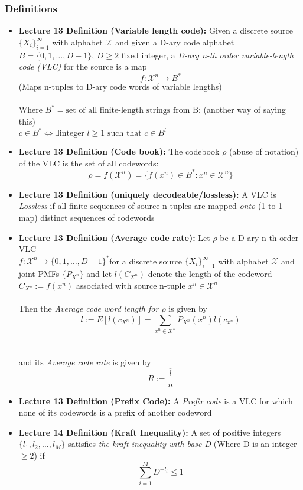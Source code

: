 \documentclass{article}
\begin{document}
\subsubsection{Definitions}
\begin{itemize}
    \item \textbf{Lecture 13 Definition (Variable length code): } Given a discrete source \(\{X_i\}^\infty_{i=1}\) with alphabet \(\mathcal{X}\) and given a D-ary code alphabet \(B = \{0,1,\ldots, D-1\}\), \(D \geq 2\) fixed integer, a \textit{D-ary n-th order variable-length code (VLC)} for the source is a map
    \[f: \mathcal{X}^n \to B^*\]
    (Maps n-tuples to D-ary code words of variable lengths)
    \\ \\Where  \(B^* = \text{set of all finite-length strings from B}\): (another way of saying this) \\ \(c \in B^* \Leftrightarrow \exists \text{integer } l\geq1 \text{ such that } c \in B^l \)
    \item \textbf{Lecture 13 Definition (Code book): } The codebook \(\rho\) (abuse of notation) of the VLC is the set of all codewords:
    \[\rho = f(\mathcal{X}^n) = \{f(x^n) \in B^* : x^n \in \mathcal{X}^n\}\]
    \item \textbf{Lecture 13 Definition (uniquely decodeable/lossless):} A VLC is \textit{Lossless} if all finite sequences of source n-tuples are mapped \textit{onto} (1 to 1 map) distinct sequences of codewords
    \item \textbf{Lecture 13 Definition (Average code rate): } Let \(\rho\) be a D-ary n-th order VLC \\ \(f: \mathcal{X}^n \to \{0,1,\ldots, D-1\}^*\)for a discrete source \(\{X_i\}_{i=1}^\infty\) with alphabet \(\mathcal{X}\) and joint PMFs \(\{P_{X^n}\}\) and let \(l(C_{X^n})\) denote the length of the codeword \(C_{X^n}:=f(x^n)\)
    associated with source n-tuple \(x^n \in \mathcal{X}^n\)
    \\
    \\
    Then the \textit{Average code word length for \(\rho\)} is given by
    \[\overline{l} := E[l(c_{X^n})] = \sum_{x^n \in \mathcal{X}^n} P_{X^n}(x^n) l(c_{x^n})\]
    \\
    \\ and its \textit{Average code rate} is given by 
    \[\overline{R}:=\frac{\overline{l}}{n}\]
    \item \textbf{Lecture 13 Definition (Prefix Code): } A \textit{Prefix code} is a VLC for which none of its codewords is a prefix of another codeword
    \item \textbf{Lecture 14 Definition (Kraft Inequality): } A set of positive integers \(\{l_1, l_2, \ldots, l_M\}\) satisfies \textit{the kraft inequality with base D} (Where D is an integer \(\geq 2\)) if 
    \[\sum_{i=1}^{M} D^{-l_i} \leq 1\]
\end{itemize}
\end{document}
